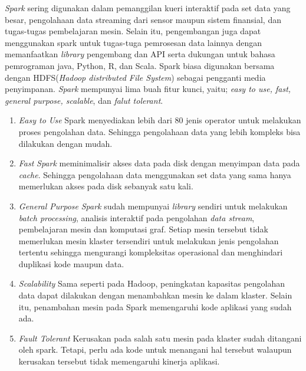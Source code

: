 \textit{Spark} sering digunakan dalam pemanggilan kueri interaktif pada set data yang besar, pengolahaan data streaming dari sensor maupun sistem finansial, dan tugas-tugas pembelajaran mesin. Selain itu, pengembangan juga dapat menggunakan spark untuk tugas-tuga pemrosesan data lainnya dengan memanfaatkan \textit{library} pengembang dan API serta dukungan untuk bahasa pemrograman java, Python, R, dan Scala. Spark biasa digunakan bersama dengan HDFS(\textit{Hadoop distributed File System}) sebagai pengganti media penyimpanan. \textit{Spark} mempunyai lima buah fitur kunci, yaitu; \textit{easy to use, fast, general purpose, scalable}, dan \textit{falut tolerant}.
\begin{enumerate}
	\item{\textit{Easy to Use} \newline
	Spark menyediakan lebih dari 80 jenis operator untuk melakukan proses pengolahan data. 			
	Sehingga pengolahaan data yang lebih kompleks bisa dilakukan dengan mudah.
	}
	
	\item{\textit{Fast} \newline
	\textit{Spark} meminimalisir akses data pada disk dengan menyimpan data pada 					
	\textit{cache}. Sehingga pengolahaan data menggunakan set data yang sama hanya memerlukan 		
	akses pada disk sebanyak satu kali.
	}
	
	\item{\textit{General Purpose} \newline
	\textit{Spark} sudah mempunyai \textit{library} sendiri untuk melakukan \textit{batch 			
	processing}, analisis interaktif pada pengolahan \textit{data stream}, pembelajaran mesin dan 
	komputasi graf. Setiap mesin tersebut tidak memerlukan mesin klaster tersendiri untuk 		
	melakukan jenis pengolahan tertentu sehingga mengurangi kompleksitas operasional dan 			
	menghindari duplikasi kode maupun data.
	}
	
	\item{\textit{Scalability} \newline
	Sama seperti pada Hadoop, peningkatan kapasitas pengolahan data dapat dilakukan dengan 			
	menambahkan mesin ke dalam klaster. Selain itu, penambahan mesin pada Spark memengaruhi 		
	kode aplikasi yang sudah ada.
	}
	
	\item{\textit{Fault Tolerant} \newline
	Kerusakan pada salah satu mesin pada klaster sudah ditangani oleh spark. Tetapi, perlu ada 		
	kode untuk menangani hal tersebut walaupun kerusakan tersebut tidak memengaruhi kinerja 		
	aplikasi.	
	}
	
\end{enumerate}
